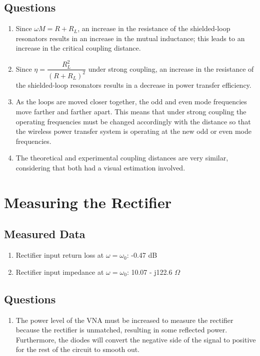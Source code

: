 \documentclass{article}
\begin{document}
\subsection{Questions}

\begin{enumerate}
	\item Since $\omega M = R + R_L$, an increase in the resistance of the shielded-loop resonators results in an increase in the mutual inductance; this leads to an increase in the critical coupling distance.
	\item Since $\eta = \dfrac{R_L^2}{(R+R_L)^2}$ under strong coupling, an increase in the resistance of the shielded-loop resonators results in a decrease in power transfer efficiency.
	\item As the loops are moved closer together, the odd and even mode frequencies move farther and farther apart. This means that under strong coupling the operating frequencies must be changed accordingly with the distance so that the wireless power transfer system is operating at the new odd or even mode frequencies.
	\item The theoretical and experimental coupling distances are very similar, considering that both had a visual estimation involved.
\end{enumerate}


\section{Measuring the Rectifier}

\subsection{Measured Data}

\begin{enumerate}
	\item Rectifier input return loss at $\omega = \omega_0$: -0.47 dB
	\item Rectifier input impedance at $\omega = \omega_0$: 10.07 - j122.6 $\Omega$
\end{enumerate}

\subsection{Questions}

\begin{enumerate}
	\item The power level of the VNA must be increased to measure the rectifier because the rectifier is unmatched, resulting in some reflected power. Furthermore, the diodes will convert the negative side of the signal to positive for the rest of the circuit to smooth out.
\end{enumerate}
\end{document}

